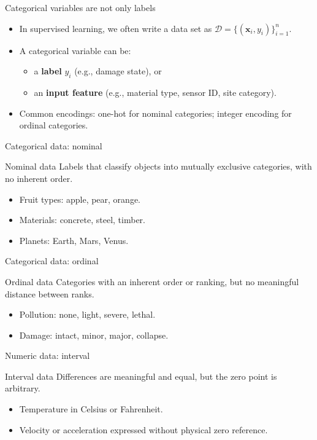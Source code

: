 \documentclass[12pt]{beamer}
\begin{document}
\begin{frame}{Categorical variables are not only labels}
  \begin{itemize}
    \item In supervised learning, we often write a data set as $\mathcal{D}=\{(\bm{x}_i,y_i)\}_{i=1}^n$.
    \item A categorical variable can be:
      \begin{itemize}
        \item a \textbf{label} $y_i$ (e.g., damage state), or
        \item an \textbf{input feature} (e.g., material type, sensor ID, site category).
      \end{itemize}
    \item Common encodings: one-hot for nominal categories; integer encoding for ordinal categories.
  \end{itemize}
\end{frame}

\begin{frame}{Categorical data: nominal}
  \begin{conceptbox}{Nominal data}
    Labels that classify objects into mutually exclusive categories, with no inherent order.
  \end{conceptbox}
  \begin{itemize}
    \item Fruit types: apple, pear, orange.
    \item Materials: concrete, steel, timber.
    \item Planets: Earth, Mars, Venus.
  \end{itemize}
\end{frame}

\begin{frame}{Categorical data: ordinal}
  \begin{conceptbox}{Ordinal data}
    Categories with an inherent order or ranking, but no meaningful distance between ranks.
  \end{conceptbox}
  \begin{itemize}
    \item Pollution: none, light, severe, lethal.
    \item Damage: intact, minor, major, collapse.
  \end{itemize}
\end{frame}

\begin{frame}{Numeric data: interval}
  \begin{conceptbox}{Interval data}
    Differences are meaningful and equal, but the zero point is arbitrary.
  \end{conceptbox}
  \begin{itemize}
    \item Temperature in Celsius or Fahrenheit.
    \item Velocity or acceleration expressed without physical zero reference.
  \end{itemize}
\end{frame}
\end{document}
